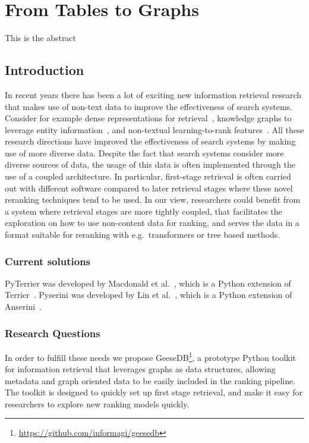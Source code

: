 \chapter{From Tables to Graphs}
\label{from-tables-to-graphs}

\begin{Abstract}
	\begin{changemargin}{1cm}{1cm}
		This is the abstract 
	\end{changemargin}
\end{Abstract}

\section{Introduction}
In recent years there has been a lot of exciting new information retrieval research that makes use of non-text data to improve the effectiveness of search systems. Consider for example dense representations for retrieval~\cite{dense-retrieval-1, dense-retrieval-2, dense-retrieval-3}, knowledge graphs to leverage entity information~\cite{entity-1, entity-2, entity-3}, and non-textual learning-to-rank features~\cite{ltr-1, ltr-2}. All these research directions have improved the effectiveness of search systems by making use of more diverse data. Despite the fact that search systems consider more diverse sources of data, the usage of this data is often implemented through the use of a coupled architecture. In particular, first-stage retrieval is often carried out with different software compared to later retrieval stages where these novel reranking techniques tend to be used. In our view, researchers could benefit from a system where retrieval stages are more tightly coupled, that facilitates the exploration on how to use non-content data for ranking, and serves the data in a format suitable for reranking with e.g.\ transformers or tree based methods.

\subsection{Current solutions}
PyTerrier was developed by Macdonald et al.~\cite{pyterrier}, which is a Python extension of Terrier~\cite{terrier}. 
Pyserini was developed by Lin et al.~\cite{pyserini}, which is a Python extension of Anserini~\cite{anserini}.


\subsection{Research Questions}
In order to fulfill these needs we propose GeeseDB\footnote{\url{https://github.com/informagi/geesedb}}, a prototype Python toolkit for information retrieval that leverages graphs as data structures, allowing metadata and graph oriented data to be easily included in the ranking pipeline. The toolkit is designed to quickly set up first stage retrieval, and make it easy for researchers to explore new ranking models quickly. 

